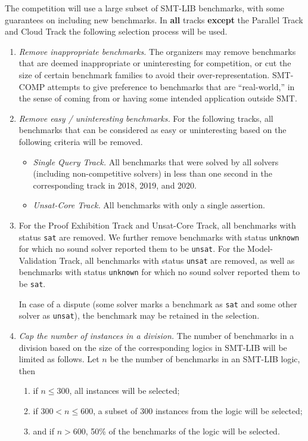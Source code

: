 \documentclass[12pt]{article}
\newcommand{\maintrack}{Single Query Track\xspace}
\newcommand{\ucoretrack}{Unsat-Core Track\xspace}
\newcommand{\mvaltrack}{Model-Validation Track\xspace}
\newcommand{\paralleltrack}{Parallel Track\xspace}
\newcommand{\cloudtrack}{Cloud Track\xspace}
\newcommand{\prooftrack}{Proof Exhibition Track\xspace}
\begin{document}
 \label{benchmark-selection}
The competition will use a large subset of SMT-LIB benchmarks, with some
guarantees on including new benchmarks.  In \textbf{all} tracks
\textbf{except} the \paralleltrack and \cloudtrack
the following selection process will be used.
\begin{enumerate}
\item \emph{Remove inappropriate benchmarks.} The
  organizers may remove benchmarks that are deemed inappropriate or
  uninteresting for competition, or cut the size of certain benchmark
  families to avoid their over-representation.  SMT-COMP attempts to
  give preference to benchmarks that are ``real-world,'' in the sense
  of coming from or having some intended application outside SMT.
\item \emph{Remove easy / uninteresting benchmarks.}
  For the following tracks, all benchmarks that can be
  considered as easy or uninteresting based on the following criteria
  will be removed.
  \begin{itemize}
    \item \emph{\maintrack.} All benchmarks that were solved by all
      solvers (including non-competitive solvers) in less than one second in
          the corresponding track in 2018, 2019, and 2020.
    \item \emph{\ucoretrack.} All benchmarks with only a single assertion.
  \end{itemize}

\item
  For the \prooftrack and \ucoretrack, all benchmarks with status
  \texttt{sat} are removed.  We further remove benchmarks with status
  \texttt{unknown} for which no sound solver reported them to be
  \texttt{unsat}.
  For the \mvaltrack,  all benchmarks with status \texttt{unsat} are removed,
  as well as benchmarks with status
  \texttt{unknown} for which no sound solver reported them to be
  \texttt{sat}.

  In case of a dispute (some solver marks a benchmark as \texttt{sat}
  and some other solver as \texttt{unsat}), the benchmark may be retained in
  the selection.

\item \emph{Cap the number of instances in a division.}
  The number of benchmarks in a division based on the size of the
  corresponding logics in SMT-LIB will be limited as follows.
  Let $n$ be the number of benchmarks in an SMT-LIB logic, then
  \begin{enumerate}
  \vspace{-1ex}
    \item \label{bench-sel-300} if $n \le 300$, all instances will be selected;
  \item \label{bench-sel-600} if $300 < n \leq 600$, a subset of 300 instances
    from the logic will be selected;
  \item \label{bench-sel-more} and if $n > 600$,
      50\% of the benchmarks of the logic will be selected.
  \end{enumerate}
\end{enumerate}
\end{document}
